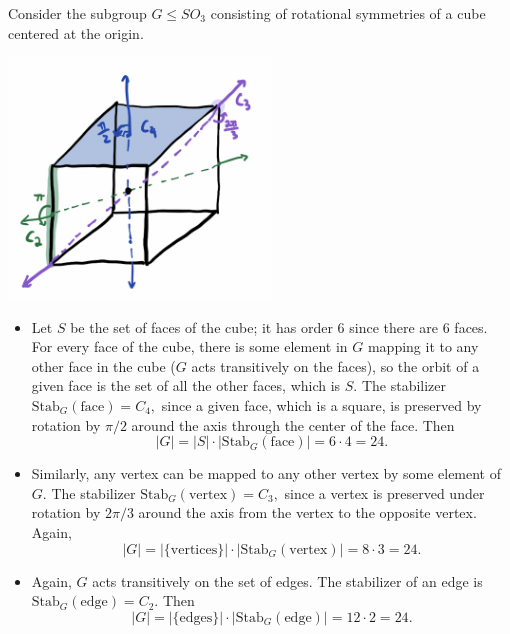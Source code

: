 \begin{example}
Consider the subgroup $G \leq SO_3$ consisting of rotational symmetries of a cube centered at the origin. 


\begin{center}
    \includegraphics[width=7cm]{Lecture Files and Images/lec17-cube.png}
\end{center}


\begin{itemize}
    \item Let $S$ be the set of faces of the cube; it has order 6 since there are 6 faces. For every face of the cube, there is some element in $G$ mapping it to any other face in the cube ($G$ acts transitively on the faces), so the orbit of a given face is the set of all the other faces, which is $S.$ The stabilizer $\text{Stab}_G(\text{face}) = C_4,$ since a given face, which is a square, is preserved by rotation by $\pi/2$ around the axis through the center of the face. Then 
    \[
    |G| = |S| \cdot |\text{Stab}_G(\text{face})| = 6 \cdot 4 = 24.
    \]
    
    \item Similarly, any vertex can be mapped to any other vertex by some element of $G.$ The stabilizer $\text{Stab}_G(\text{vertex}) = C_3,$ since a vertex is preserved under rotation by $2\pi/3$ around the axis from the vertex to the opposite vertex. Again, 
    \[
    |G| = |\{\text{vertices}\}|\cdot|\text{Stab}_G(\text{vertex})| = 8 \cdot 3 = 24.
    \]
    
    \item Again, $G$ acts transitively on the set of edges. The stabilizer of an edge is $\text{Stab}_G(\text{edge}) = C_2$. Then 
    \[
    |G| =  |\{\text{edges}\}|\cdot|\text{Stab}_G(\text{edge})| = 12 \cdot 2 = 24.
    \]
\end{itemize}

\end{example}

\newpage